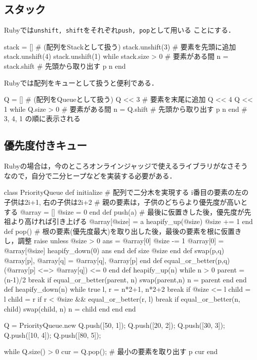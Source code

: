 \subsection{スタック}

Rubyでは\texttt{unshift, shift}をそれぞれ\texttt{push, pop}として用いる
ことにする．
\begin{rbox}[emph={unshift,shift}]
stack = [] # (配列をStackとして扱う)
stack.unshift(3) # 要素を先頭に追加
stack.unshift(4)
stack.unshift(1)
while stack.size > 0 # 要素がある間
  n = stack.shift # 先頭から取り出す
  p n
end  
\end{rbox}


Rubyでは配列をキューとして扱うと便利である．
\begin{rbox}[emph={shift}]
Q = [] # (配列をQueueとして扱う)
Q << 3 # 要素を末尾に追加
Q << 4
Q << 1
while Q.size > 0 # 要素がある間
  n = Q.shift # 先頭から取り出す
  p n
end
# 3, 4, 1  の順に表示される
\end{rbox}

\subsection{優先度付きキュー}

Rubyの場合は，今のところオンラインジャッジで使えるライブラリがなさそうなので，自分で二分ヒープなどを実装する必要がある．
\begin{rbox}[emph={PriorityQueue,push,pop,size}]
class PriorityQueue
  def initialize
    # 配列で二分木を実現する i番目の要素の左の子供は2i+1, 右の子供は2i+2
    # 親の要素は，子供のどちらより優先度が高いとする
    @array = [] 
    @size = 0
  end
  def push(a)
    # 最後に仮置きした後，優先度が先祖より高ければ引き上げる
    @array[@size] = a
    heapify_up(@size)
    @size += 1
  end
  def pop()
    # 根の要素(優先度最大)を取り出した後，最後の要素を根に仮置きし，調整
    raise unless @size > 0
    ans = @array[0]
    @size -= 1
    @array[0] = @array[@size]
    heapify_down(0)
    ans
  end
  def size
    @size
  end
  def swap(p,q) 
    @array[p],  @array[q] = @array[q], @array[p]
  end
  def equal_or_better(p,q)
    (@array[p] <=> @array[q]) <= 0
  end
  def heapify_up(n)
    while n > 0
      parent = (n-1)/2
      break if equal_or_better(parent, n)
      swap(parent,n)
      n = parent
    end
  end
  def heapify_down(n)
    while true
      l, r = n*2+1, n*2+2
      break if @size <= l
      child = l
      child = r if r < @size && equal_or_better(r, l)
      break if equal_or_better(n, child)
      swap(child, n)
      n = child
    end
  end
end

Q = PriorityQueue.new
Q.push([50, 1]);
Q.push([20, 2]);
Q.push([30, 3]);
Q.push([10, 4]);
Q.push([80, 5]);

while Q.size() > 0
  cur = Q.pop(); # 最小の要素を取り出す
  p cur
end
\end{rbox}

